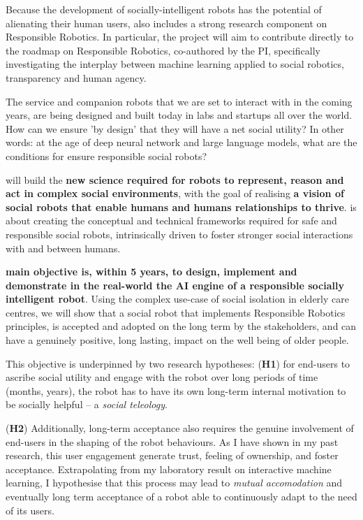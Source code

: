 \begin{framed}
\vspace{0.4em}

\noindent Because the development of socially-intelligent robots has the potential of
alienating their human users, \project also includes a strong research component
on Responsible Robotics. In particular, the project will aim to contribute
directly to the roadmap on Responsible Robotics, co-authored by the PI,
specifically investigating the interplay between machine learning applied to
social robotics, transparency and human agency.

\end{framed}

The service and companion robots that we are set to interact with in the coming
years, are being designed and built today in labs and startups all over the
world. How can we ensure 'by design' that they will have a net social utility?
In other words: at the age of deep neural network and large language models,
what are the conditions for ensure responsible social robots?

\project will build the \textbf{new science required for robots to represent, reason and
act in complex social environments}, with the goal of realising \textbf{a vision
of social robots that enable humans and humans relationships to thrive}.
\project is about creating the conceptual and technical frameworks required for
safe and responsible social robots, intrinsically driven to foster stronger
social interactions with and between humans.

\textbf{\project main objective is, within 5
years, to design, implement and demonstrate in the real-world the AI engine of a
responsible socially intelligent robot}. Using the complex use-case of social
isolation in elderly care centres, we will show that a social robot that
implements Responsible Robotics principles, is accepted and adopted on the long
term by the stakeholders, and can have a genuinely positive, long lasting,
impact on the well being of older people.

This objective is underpinned by two research hypotheses: (\textbf{H1}) for
end-users to ascribe social utility and engage with the robot over long periods
of time (months, years), the robot has to have its own long-term internal
motivation to be socially helpful -- a \emph{social teleology}.

(\textbf{H2}) Additionally, long-term acceptance also requires the
genuine involvement of end-users in the shaping of the robot behaviours. As I
have shown in my past research, this user engagement generate trust, feeling of
ownership, and foster acceptance. Extrapolating from my laboratory result on
interactive machine learning, I hypothesise that this process may lead to
\emph{mutual accomodation} and eventually long term acceptance of a robot able
to continuously adapt to the need of its users.

